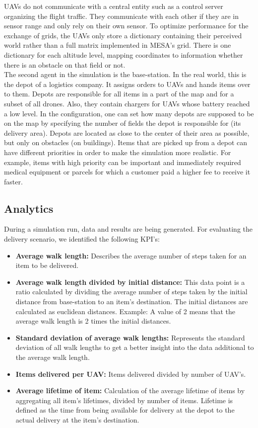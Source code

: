 UAVs do not communicate with a central entity such as a control server organizing the flight traffic. They communicate with each other if they are in sensor range and only rely on their own sensor.
To optimize performance for the exchange of grids, the UAVs only store a dictionary containing their perceived world rather than a full matrix implemented in MESA's grid.
There is one dictionary for each altitude level, mapping coordinates to information whether there is an obstacle on that field or not.  
\\
The second agent in the simulation is the base-station. In the real world, this is the depot of a logistics company. It assigns orders to UAVs and hands items over to them. Depots are responsible for all items in a part of the map and for a subset of all drones. Also, they contain chargers for UAVs whose battery reached a low level. In the configuration, one can set how many depots are supposed to be on the map by specifying the number of fields the depot is responsible for (its delivery area). Depots are located as close to the center of their area as possible, but only on obstacles (on buildings). Items that are picked up from a depot can have different priorities in order to make the simulation more realistic. For example, items with high priority can be important and immediately required medical equipment or parcels for which a customer paid a higher fee to receive it faster.



\subsection{Analytics}\label{sec:KPI}
During a simulation run, data and results are being generated.
For evaluating the delivery scenario, we identified the following KPI's:
\begin{itemize}
	\item \textbf{Average walk length:} Describes the average number of steps taken for an item to be delivered. 
	\item \textbf{Average walk length divided by initial distance:} This data point is a ratio calculated by dividing the average number of steps taken by the initial distance from base-station to an item's destination. The initial distances are calculated as euclidean distances. Example: A value of 2 means that the average walk length is 2 times the initial distances.
	\item \textbf{Standard deviation of average walk lengths:} Represents the standard deviation of all walk lengths to get a better insight into the data additional to the average walk length.
	\item \textbf{Items delivered per UAV:} Items delivered divided by number of UAV's.
	\item \textbf{Average lifetime of item:} Calculation of the average lifetime of items by aggregating all item's lifetimes, divided by number of items. Lifetime is defined as the time from being available for delivery at the depot to the actual delivery at the item's destination.
\end{itemize}

